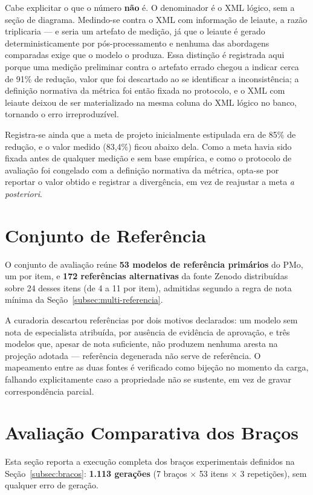Cabe explicitar o que o número \textbf{não} é. O denominador é o XML lógico, sem a seção de diagrama. Medindo-se contra o XML com informação de leiaute, a razão triplicaria — e seria um artefato de medição, já que o leiaute é gerado deterministicamente por pós-processamento e nenhuma das abordagens comparadas exige que o modelo o produza. Essa distinção é registrada aqui porque uma medição preliminar contra o artefato errado chegou a indicar cerca de 91\% de redução, valor que foi descartado ao se identificar a inconsistência; a definição normativa da métrica foi então fixada no protocolo, e o XML com leiaute deixou de ser materializado na mesma coluna do XML lógico no banco, tornando o erro irreproduzível.

Registra-se ainda que a meta de projeto inicialmente estipulada era de 85\% de redução, e o valor medido (83,4\%) ficou abaixo dela. Como a meta havia sido fixada antes de qualquer medição e sem base empírica, e como o protocolo de avaliação foi congelado com a definição normativa da métrica, opta-se por reportar o valor obtido e registrar a divergência, em vez de reajustar a meta \textit{a posteriori}.

\section{Conjunto de Referência}
\label{sec:res-gold}

O conjunto de avaliação reúne \textbf{53 modelos de referência primários} do PMo, um por item, e \textbf{172 referências alternativas} da fonte Zenodo distribuídas sobre 24 desses itens (de 4 a 11 por item), admitidas segundo a regra de nota mínima da Seção~\ref{subsec:multi-referencia}.

A curadoria descartou referências por dois motivos declarados: um modelo sem nota de especialista atribuída, por ausência de evidência de aprovação, e três modelos que, apesar de nota suficiente, não produzem nenhuma aresta na projeção adotada — referência degenerada não serve de referência. O mapeamento entre as duas fontes é verificado como bijeção no momento da carga, falhando explicitamente caso a propriedade não se sustente, em vez de gravar correspondência parcial.

\section{Avaliação Comparativa dos Braços}
\label{sec:res-bracos}

Esta seção reporta a execução completa dos braços experimentais definidos na Seção~\ref{subsec:bracos}: \textbf{1.113 gerações} (7 braços $\times$ 53 itens $\times$ 3 repetições), sem qualquer erro de geração.

